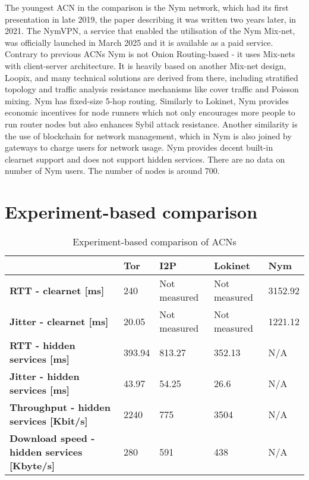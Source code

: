 The youngest ACN in the comparison is the Nym network, which had its first presentation in late 2019, the paper describing it was written two years later, in 2021. The NymVPN, a service that enabled the utilisation of the Nym Mix-net, was officially launched in March 2025 and it is available as a paid service. Contrary to previous ACNs Nym is not Onion Routing-based - it uses Mix-nets with client-server architecture. It is heavily based on another Mix-net design, Loopix, and many technical solutions are derived from there, including stratified topology and traffic analysis resistance mechanisms like cover traffic and Poisson mixing. Nym has fixed-size 5-hop routing. Similarly to Lokinet, Nym provides economic incentives for node runners which not only encourages more people to run router nodes but also enhances Sybil attack resistance. Another similarity is the use of blockchain for network management, which in Nym is also joined by gateways to charge users for network usage. Nym provides decent built-in clearnet support and does not support hidden services. There are no data on number of Nym users. The number of nodes is around 700.

\section{Experiment-based comparison}

\begin{table}[!ht]
\caption{Experiment-based comparison of ACNs}
\label{tab:experiment_comparison}
\small
\begin{tabular}{|p{}|p{}|p{}|p{}|p{}|}
\hline
\textbf{} & \textbf{Tor} & \textbf{I2P} & \textbf{Lokinet} & \textbf{Nym} \\
\hline
\textbf{RTT - clearnet [ms]} & 240 & Not measured & Not measured & 3152.92 \\
\hline
\textbf{Jitter - clearnet [ms]} & 20.05 & Not measured & Not measured & 1221.12 \\
\hline
\textbf{RTT - hidden services [ms]} & 393.94 & 813.27 & 352.13 & N/A \\
\hline
\textbf{Jitter - hidden services [ms]} & 43.97 & 54.25 & 26.6 & N/A \\
\hline
\textbf{Throughput - hidden services [Kbit/s]} & 2240 & 775 & 3504 & N/A \\
\hline
\textbf{Download speed - hidden services [Kbyte/s]} & 280 & 591 & 438 & N/A \\
\hline
\end{tabular}
\end{table}

